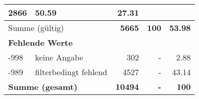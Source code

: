 \begin{longtable}{lXrrr}
       \num{2866} &
       \num[round-mode=places,round-precision=2]{50,59} &
         \num[round-mode=places,round-precision=2]{27,31} \\
     \midrule
     \multicolumn{2}{l}{Summe (gültig)} &
       \textbf{\num{5665}} &
     \textbf{100} &
       \textbf{\num[round-mode=places,round-precision=2]{53,98}} \\
     \multicolumn{5}{l}{\textbf{Fehlende Werte}}\\
       -998 &
       keine Angabe &
         \num{302} &
        - &
         \num[round-mode=places,round-precision=2]{2,88} \\
       -989 &
       filterbedingt fehlend &
         \num{4527} &
        - &
         \num[round-mode=places,round-precision=2]{43,14} \\
     \midrule
     \multicolumn{2}{l}{\textbf{Summe (gesamt)}} &
          \textbf{\num{10494}} &
        \textbf{-} &
        \textbf{100} \\
     \bottomrule
     \end{longtable}
     
